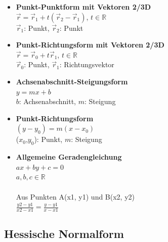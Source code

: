 \begin{itemize}
    \item \textbf{Punkt-Punktform mit Vektoren 2/3D} \\
          $\vec{r} = \vec{r}_1 + t(\vec{r}_2 - \vec{r}_1)$, $t \in \mathbb{R}$ \\
          $\vec{r}_1$: Punkt, $\vec{r}_2$: Punkt
    \item \textbf{Punkt-Richtungsform mit Vektoren 2/3D} \\
          $\vec{r} = \vec{r}_0 + t\vec{r}_1$, $t \in \mathbb{R}$ \\
          $\vec{r}_0$: Punkt, $\vec{r}_1$: Richtungsvektor
    \item \textbf{Achsenabschnitt-Steigungsform} \\
          $y=mx+b$ \\
          $b$: Achsenabschnitt, $m$: Steigung
    \item \textbf{Punkt-Richtungsform} \\
          $(y - y_0) = m(x - x_0)$ \\
          ($x_0$,$y_0$): Punkt, $m$: Steigung
    \item \textbf{Allgemeine Geradengleichung} \\
          $ax + by + c = 0$ \\
          $a,b,c \in \mathbb{R}$\\
    	  \\
    	  Aus Punkten A(x1, y1) und B(x2, y2) \\
    	  $\frac{y2 - y1}{x2 - x1} = \frac{y - y1}{x - x1}$
\end{itemize}

\subsection{Hessische Normalform}

